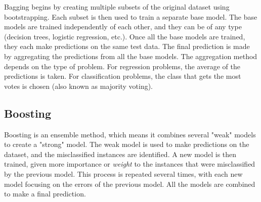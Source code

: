 \documentclass[letterpaper, 11 pt, conference]{ieeeconf}  %
\begin{document}
Bagging begins by creating multiple subsets of the original dataset using bootstrapping. Each subset is then used to train a separate base model. The base models are trained independently of each other, and they can be of any type (decision trees, logistic regression, etc.). Once all the base models are trained, they each make predictions on the same test data. The final prediction is made by aggregating the predictions from all the base models. The aggregation method depends on the type of problem. For regression problems, the average of the predictions is taken. For classification problems, the class that gets the most votes is chosen (also known as majority voting).

\subsection{Boosting}
Boosting is an ensemble method, which means it combines several "weak" models to create a "strong" model. The weak model is used to make predictions on the dataset, and the misclassified instances are identified. A new model is then trained, given more importance or \textit{weight} to the instances that were misclassified by the previous model. This process is repeated several times, with each new model focusing on the errors of the previous model. All the models are combined to make a final prediction. %
\end{document}
